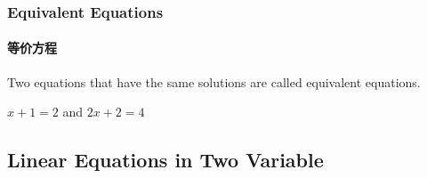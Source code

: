 \documentclass[
	11pt, %
]{beamer}
\begin{document}

\begin{frame}
	\frametitle{Equivalent Equations}
	\framesubtitle{等价方程}
	\begin{definition}
		Two equations that have the \alert{same} solutions are called equivalent equations.
	\end{definition}
	
	\smallskip %
	
	\begin{example}

  $x + 1 = 2$ and $2x + 2 = 4$

	\end{example}
	\end{frame}

\subsection{Linear Equations in Two Variable}

\end{document}
